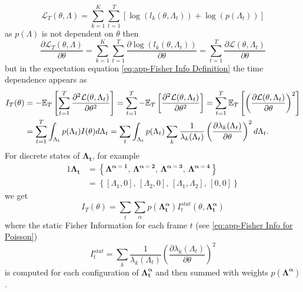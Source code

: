\begin{equation}
	\mathcal{L}_T(\theta,\Lambda)=\sum_{k=1}^K\sum_{t=1}^T\left[\log\left(l_k(\theta,\Lambda_t)\right)+\log\left(p(\Lambda_t)\right)\right]
\end{equation}
%
as $p(\Lambda)$ is not dependent on $\theta$ then
%
\begin{equation}
	\frac{\partial\mathcal{L}_T(\theta,\Lambda)}{\partial \theta}=\sum_{k=1}^K\sum_{t=1}^T\frac{\partial\log\left(l_k(\theta,\Lambda_t)\right)}{\partial \theta}=\sum_{t=1}^T\frac{\partial\mathcal{L}(\theta,\Lambda_t)}{\partial \theta}
\end{equation}
%
but in the expectation equation \autoref{eq:app-Fisher Info Definition} the time dependence appears as
%
\begin{alignat*}{1}
	I_T(\theta) & =-\mathbb{E}_T\left[\sum_{t=1}^T\frac{\partial^2\mathcal{L}(\theta,\Lambda_t)}{\partial \theta^2}\right]=\sum_{t=1}^T-\mathbb{E}_T\left[\frac{\partial^2\mathcal{L}(\theta,\Lambda_t)}{\partial \theta^2}\right]=\sum_{t=1}^T\mathbb{E}_T\left[\left(\frac{\partial\mathcal{L}(\theta,\Lambda_t)}{\partial \theta}\right)^2\right]\\
	& =\sum_{t=1}^T\int_{\Lambda_t}p(\Lambda_t)I(\theta)d\Lambda_t=\sum_t\int_{\Lambda_t}p(\Lambda_t)\sum_k\frac{1}{\lambda_k(\Lambda_t)}\left(\frac{\partial\lambda_k(\Lambda_t)}{\partial \theta}\right)^2d\Lambda_t.
\end{alignat*}
%
For discrete states of $\bm{\Lambda_t}$, for example  
%
\begin{alignat*}{1}
	\bm{\Lambda_t}
	&=\left\{\bm{\Lambda^{\alpha=1}},\,\bm{\Lambda^{\alpha=2}},\,\bm{\Lambda^{\alpha=3}},\,\bm{\Lambda^{\alpha=4}}\right\}\\
	&=\left\{[\Lambda_1,0],\,[\Lambda_2,0],\,[\Lambda_1,\Lambda_2],\,[0,0]\right\}
\end{alignat*}	
% 
we get
\begin{equation}
	I_T(\theta)=\sum_t\sum_{\alpha}p(\bm{\Lambda^{\alpha}_t})I^{stat}_t(\theta,\bm{\Lambda^{\alpha}_{t}})
\end{equation}
%
where the static Fisher Information for each frame $t$ (see \autoref{eq:app-Fisher Info for Poisson})
%
\begin{equation}
	I^{stat}_t=\sum_k\frac{1}{\lambda_k(\Lambda_t)}\left(\frac{\partial\lambda_k(\Lambda_t)}{\partial \theta}\right)^2
\end{equation}
%
 is computed for each configuration of $\bm{\Lambda_t^\alpha}$ and then summed with weights $p(\bm{\Lambda^\alpha})$. 


